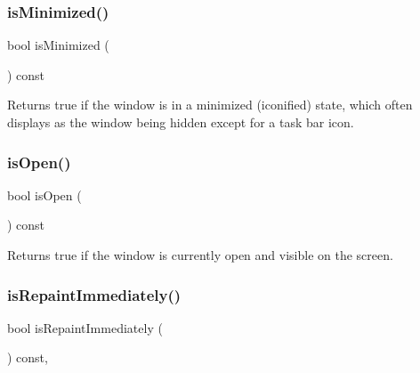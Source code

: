 \subsubsection{\texorpdfstring{is\+Minimized()}{isMinimized()}}
{\footnotesize\ttfamily bool is\+Minimized (\begin{DoxyParamCaption}{ }\end{DoxyParamCaption}) const\hspace{0.3cm}{\ttfamily [virtual]}}



Returns true if the window is in a minimized (iconified) state, which often displays as the window being hidden except for a task bar icon. 

\mbox{\label{classsgl_1_1GWindow_a002ed331862370f434b7befe331b5a0b}} 
\subsubsection{\texorpdfstring{is\+Open()}{isOpen()}}
{\footnotesize\ttfamily bool is\+Open (\begin{DoxyParamCaption}{ }\end{DoxyParamCaption}) const\hspace{0.3cm}{\ttfamily [virtual]}}



Returns true if the window is currently open and visible on the screen. 

\mbox{\label{classsgl_1_1GWindow_a45b1955433b8bf8a449a216b847d87f7}} 
\subsubsection{\texorpdfstring{is\+Repaint\+Immediately()}{isRepaintImmediately()}}
{\footnotesize\ttfamily bool is\+Repaint\+Immediately (\begin{DoxyParamCaption}{ }\end{DoxyParamCaption}) const\hspace{0.3cm}{\ttfamily [override]}, {\ttfamily [virtual]}}



